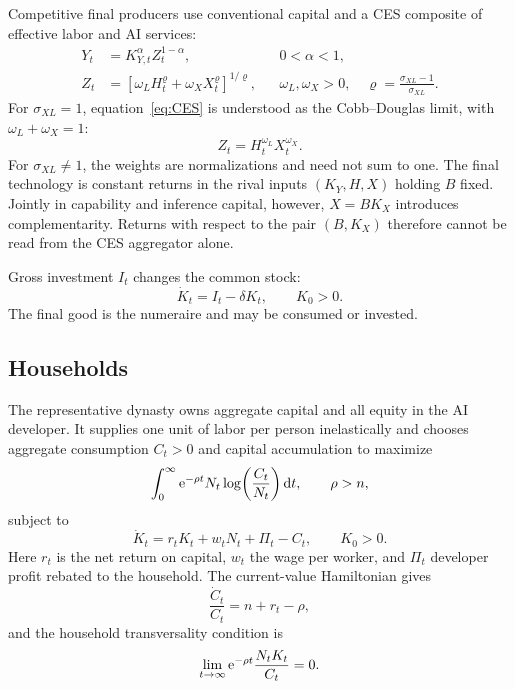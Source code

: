 Competitive final producers use conventional capital and a CES composite of effective labor and AI services:
\begin{align}
 Y_t&=K_{Y,t}^{\alpha}Z_t^{1-\alpha},
 &&0<\alpha<1, \label{eq:Y}\\
 Z_t&=\left[\omega_LH_t^{\varrho}
              +\omega_XX_t^{\varrho}\right]^{1/\varrho},
 &&\omega_L,\omega_X>0,\quad
 \varrho=\frac{\sigma_{XL}-1}{\sigma_{XL}}. \label{eq:CES}
\end{align}
For $\sigma_{XL}=1$, equation~\eqref{eq:CES} is understood as the Cobb--Douglas limit, with $\omega_L+\omega_X=1$:
\begin{equation}
 Z_t=H_t^{\omega_L}X_t^{\omega_X}.
 \label{eq:CD-composite}
\end{equation}
For $\sigma_{XL}\neq1$, the weights are normalizations and need not sum to one. The final technology is constant returns in the rival inputs $(K_Y,H,X)$ holding $B$ fixed. Jointly in capability and inference capital, however, $X=BK_X$ introduces complementarity. Returns with respect to the pair $(B,K_X)$ therefore cannot be read from the CES aggregator alone.

Gross investment $I_t$ changes the common stock:
\begin{equation}
 \dot K_t=I_t-\delta K_t,\qquad K_0>0.
 \label{eq:K-law-technology}
\end{equation}
The final good is the numeraire and may be consumed or invested.

\subsection{Households}

The representative dynasty owns aggregate capital and all equity in the AI developer. It supplies one unit of labor per person inelastically and chooses aggregate consumption $C_t>0$ and capital accumulation to maximize
\begin{equation}
 \int_0^\infty \mathrm{e}^{-\rho t}N_t
 \log\!\left(\frac{C_t}{N_t}\right)\mathrm{d} t,
 \qquad \rho>n,
 \label{eq:HH-objective}
\end{equation}
subject to
\begin{equation}
 \dot K_t=r_tK_t+w_tN_t+\Pi_t-C_t,\qquad K_0>0.
 \label{eq:HH-budget}
\end{equation}
Here $r_t$ is the net return on capital, $w_t$ the wage per worker, and $\Pi_t$ developer profit rebated to the household. The current-value Hamiltonian gives
\begin{equation}
 \frac{\dot C_t}{C_t}=n+r_t-\rho,
 \label{eq:Euler}
\end{equation}
and the household transversality condition is
\begin{equation}
 \lim_{t\to\infty}\mathrm{e}^{-\rho t}\frac{N_tK_t}{C_t}=0.
 \label{eq:HH-TVC}
\end{equation}

